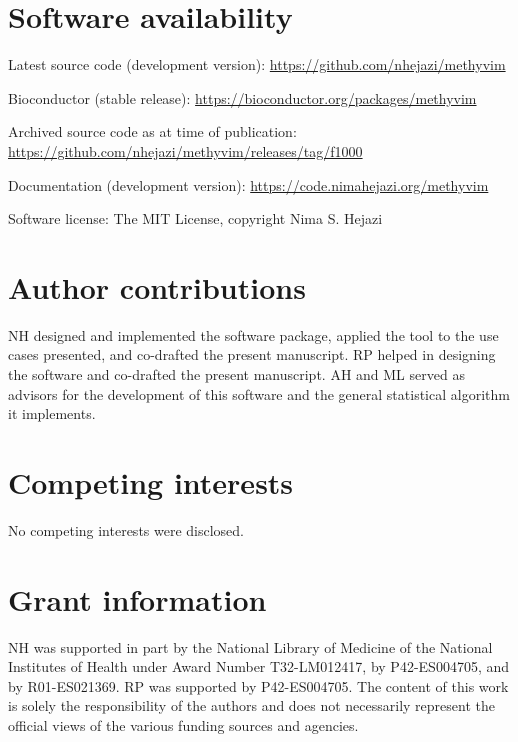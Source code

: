 \documentclass[9pt,a4paper,]{extarticle}
\theoremstyle{definition}
\theoremstyle{definition}
\theoremstyle{definition}
\theoremstyle{remark}
\begin{document}
\hypertarget{software-availability}{%
\section{Software availability}\label{software-availability}}

Latest source code (development version): \url{https://github.com/nhejazi/methyvim}

Bioconductor (stable release): \url{https://bioconductor.org/packages/methyvim}

Archived source code as at time of publication:
\url{https://github.com/nhejazi/methyvim/releases/tag/f1000}

Documentation (development version): \url{https://code.nimahejazi.org/methyvim}

Software license: The MIT License, copyright Nima S. Hejazi

\hypertarget{author-contributions}{%
\section{Author contributions}\label{author-contributions}}

NH designed and implemented the software package, applied the tool to the use
cases presented, and co-drafted the present manuscript. RP helped in designing
the software and co-drafted the present manuscript. AH and ML served as advisors
for the development of this software and the general statistical algorithm it
implements.

\hypertarget{competing-interests}{%
\section{Competing interests}\label{competing-interests}}

No competing interests were disclosed.

\hypertarget{grant-information}{%
\section{Grant information}\label{grant-information}}

NH was supported in part by the National Library of Medicine of the National
Institutes of Health under Award Number T32-LM012417, by P42-ES004705, and
by R01-ES021369. RP was supported by P42-ES004705. The content of this work is
solely the responsibility of the authors and does not necessarily represent the
official views of the various funding sources and agencies.

\renewcommand\refname{References}
{\small}
\end{document}
